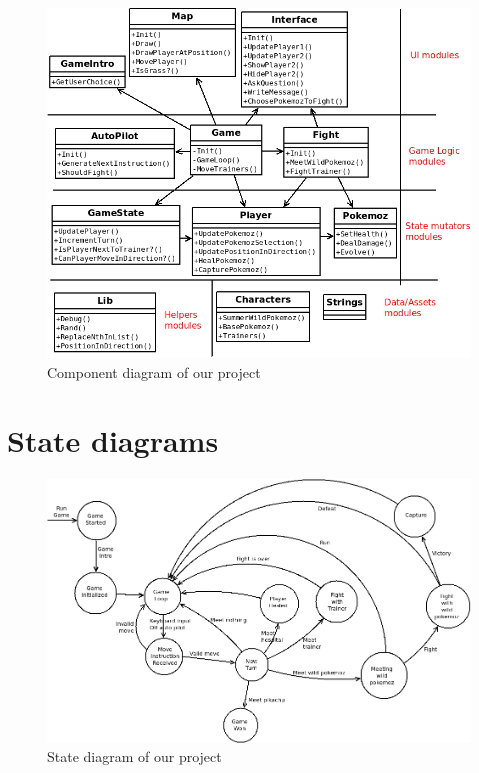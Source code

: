 \documentclass[10pt, a4paper]{article}
\begin{document}

\begin{figure}

\includegraphics[width=\linewidth]{Diagramme1.png}
\caption{Component diagram of our project}
\end{figure}



\section{State diagrams}

\begin{figure}[!ht]
 \includegraphics[width=\linewidth]{State_diagram_oz.png}
 \caption{State diagram of our project}
\end{figure}
\end{document}
